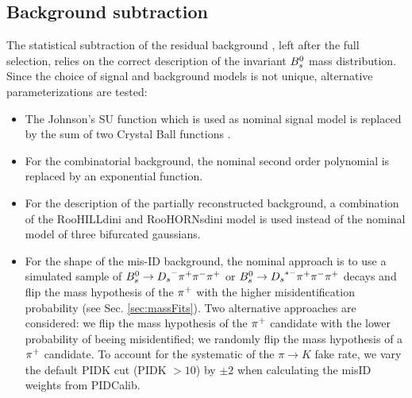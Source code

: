 \subsection{Background subtraction}
\label{subsec:SystMass}
\enlargethispage{2\baselineskip}

The statistical subtraction of the residual background \cite{Pivk:2004ty}, left after the full selection, relies on the correct description of the invariant ${{B}^0_{s}}$ mass distribution.
Since the choice of signal and background models is not unique, alternative parameterizations are tested:

\begin{itemize}

\item The \textsf{Johnson's SU} function which is used as nominal signal model is replaced by the sum of two \textsf{Crystal Ball} functions \cite{CB}. 

\item For the combinatorial background, the nominal second order polynomial is replaced by an exponential function. 

\item For the description of the partially reconstructed background, 
a combination of the \textsf{RooHILLdini} and \textsf{RooHORNsdini} model \cite{Hill:2253246} is used instead of the nominal model of three bifurcated gaussians. 

\item For the shape of the mis-ID background, 
the nominal approach is to use a simulated sample of ${{B}^0_{s}}\rightarrow{\ensuremath{{D}_{s}}}^{-}{{\pi}^+}{{\pi}^-}{{\pi}^+}$ or ${{B}^0_{s}}\rightarrow{\ensuremath{{D}_{s}}}^{*-}{{\pi}^+}{{\pi}^-}{{\pi}^+}$ 
decays and flip the mass hypothesis of the ${{\pi}^+}$ with the higher misidentification probability (see Sec. \ref{sec:massFits}). 
Two alternative approaches are considered:
we flip the mass hypothesis of the ${{\pi}^+}$ candidate with the lower probability of beeing misidentified; we randomly flip the mass hypothesis of a ${{\pi}^+}$ candidate.
To account for the systematic of the $\pi \to K$ fake rate, we 
vary the default PIDK cut (PIDK $> 10$) by $\pm 2$ when calculating the misID weights from \textsf{PIDCalib}.

\end{itemize}
